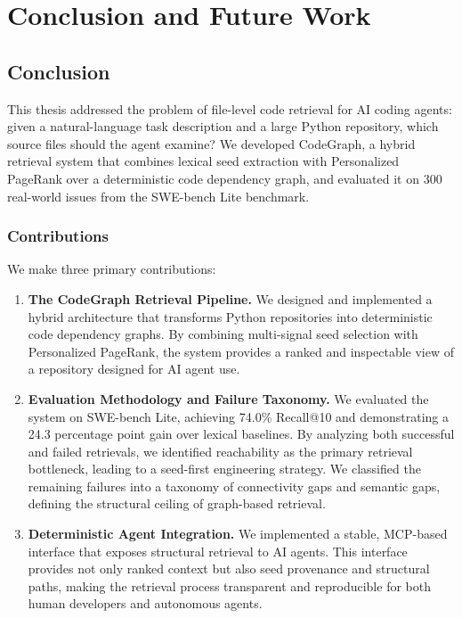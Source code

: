 
\chapter{Conclusion and Future Work}
\label{ch:conclusion}


\section{Conclusion}
\label{sec:final-conclusion}

This thesis addressed the problem of file-level code retrieval for AI coding agents: given a natural-language task description and a large Python repository, which source files should the agent examine? We developed CodeGraph, a hybrid retrieval system that combines lexical seed extraction with Personalized PageRank over a deterministic code dependency graph, and evaluated it on 300 real-world issues from the SWE-bench Lite benchmark.

\subsection{Contributions}

We make three primary contributions:

\begin{enumerate}
\item \textbf{The CodeGraph Retrieval Pipeline.} We designed and implemented a hybrid architecture that transforms Python repositories into deterministic code dependency graphs. By combining multi-signal seed selection with Personalized PageRank, the system provides a ranked and inspectable view of a repository designed for AI agent use.

\item \textbf{Evaluation Methodology and Failure Taxonomy.} We evaluated the system on SWE-bench Lite, achieving 74.0\% Recall@10 and demonstrating a 24.3 percentage point gain over lexical baselines. By analyzing both successful and failed retrievals, we identified reachability as the primary retrieval bottleneck, leading to a seed-first engineering strategy. We classified the remaining failures into a taxonomy of connectivity gaps and semantic gaps, defining the structural ceiling of graph-based retrieval.

\item \textbf{Deterministic Agent Integration.} We implemented a stable, MCP-based interface that exposes structural retrieval to AI agents. This interface provides not only ranked context but also seed provenance and structural paths, making the retrieval process transparent and reproducible for both human developers and autonomous agents.

\end{enumerate}

